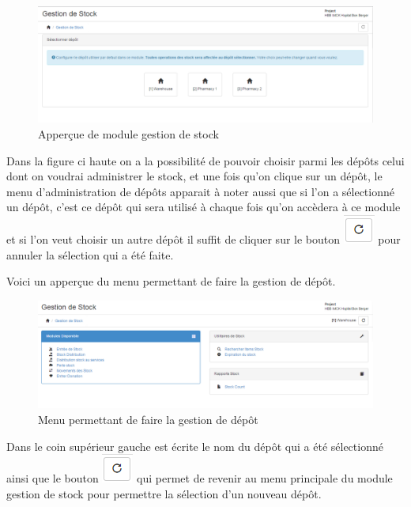 \documentclass[12pt,a4paper]{report}
\begin{document}
\begin{figure}[h]
\begin{center}
\includegraphics[width=12cm]{pic/MenuGestStock.png}
\end{center}
\caption{Apperçue de module gestion de stock}
\label{Apperçue de module gestion de stock}
\end{figure}

Dans la figure ci haute on a la possibilité de pouvoir choisir parmi les dépôts celui dont on voudrai administrer le stock, et une fois qu'on clique sur un dépôt, le menu d'administration de dépôts apparait à noter aussi que si l'on a sélectionné un dépôt, c'est ce dépôt qui sera utilisé à chaque fois qu'on accèdera à ce module et si l'on veut choisir un autre dépôt il suffit de cliquer sur le bouton \includegraphics[scale=0.7]{pic/refresh.png} pour annuler la sélection qui a été faite.

Voici un apperçue du menu permettant de faire la gestion de dépôt.

\begin{figure}[h]
\begin{center}
\includegraphics[width=12cm]{pic/MenuStock.png}
\end{center}
\caption{Menu permettant de faire la gestion de dépôt}
\label{Menu permettant de faire la gestion de dépôt}
\end{figure} 

Dans le coin supérieur gauche est écrite le nom du dépôt qui a été sélectionné ainsi que le bouton \includegraphics[scale=0.7]{pic/refresh.png} qui permet de revenir au menu principale du module gestion de stock pour permettre la sélection d'un nouveau dépôt.
\end{document}
